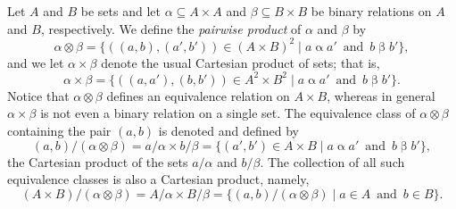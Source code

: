 Let $A$ and $B$ be sets and let $\alpha \subseteq A\times A$ and $\beta \subseteq B\times B$
be binary relations on $A$ and $B$, respectively.
We define
the \emph{pairwise product} of $\alpha$ and $\beta$ by
\begin{equation}
\label{eq:pair-product}
\alpha \otimes \beta = \{((a, b), (a', b')) 
\in (A\times B)^2 \mid a\mathrel{\alpha} a'\, \text{ and } \,  b\mathrel{\beta} b'\},
\end{equation}
and we let $\alpha \times \beta$ denote the usual Cartesian product of sets; that is,
\begin{equation}
\label{eq:set-product}
\alpha \times \beta = \{((a, a'), (b, b')) 
\in A^2\times B^2 \mid a\mathrel{\alpha} a' \, \text{ and } \, b\mathrel{\beta} b'\}.
\end{equation}
Notice that $\alpha \otimes \beta$ defines an equivalence relation on
$A\times B$, whereas in general $\alpha\times \beta$ is 
not even a binary relation on a single set.
The equivalence class of $\alpha \otimes \beta$ containing the pair
$(a, b)$ is denoted and defined by %
\[(a,b)/(\alpha \otimes \beta) = a/\alpha \times b/\beta= 
    \{(a', b') \in A\times B \mid a\mathrel{\alpha} a' \, \text{ and } \,  b\mathrel{\beta} b'\},
    \]
the Cartesian product of the sets $a/\alpha$ and $b/\beta$.
The collection of all such equivalence classes is also a Cartesian product, namely,
\[
(A\times B)/(\alpha \otimes \beta) =
A/\alpha \times B/\beta  = \{(a, b)/(\alpha \otimes \beta) \mid a\in A \, \text{ and } \, b \in B\}.\]

